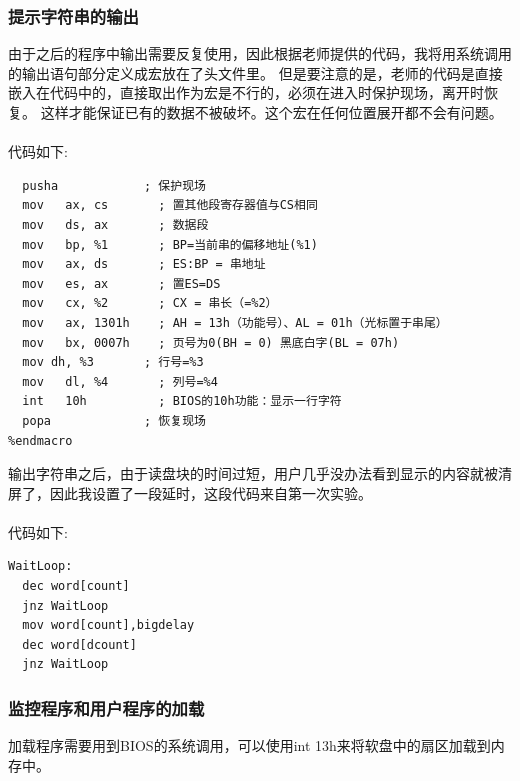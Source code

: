 \documentclass[a4paper, 11pt]{article} %
\begin{document}
\subsubsection{提示字符串的输出}

由于之后的程序中输出需要反复使用，因此根据老师提供的代码，我将用系统调用的输出语句部分定义成宏放在了头文件里。
但是要注意的是，老师的代码是直接嵌入在代码中的，直接取出作为宏是不行的，必须在进入时保护现场，离开时恢复。
这样才能保证已有的数据不被破坏。这个宏在任何位置展开都不会有问题。
\paragraph{}
代码如下:
\begin{lstlisting}[language={[x86masm]Assembler},caption=字符串输出宏]
%macro PRINT 4
  pusha            ; 保护现场
  mov	ax, cs       ; 置其他段寄存器值与CS相同
  mov	ds, ax       ; 数据段
  mov	bp, %1       ; BP=当前串的偏移地址(%1)
  mov	ax, ds       ; ES:BP = 串地址
  mov	es, ax       ; 置ES=DS
  mov	cx, %2       ; CX = 串长（=%2）
  mov	ax, 1301h    ; AH = 13h（功能号）、AL = 01h（光标置于串尾）
  mov	bx, 0007h    ; 页号为0(BH = 0) 黑底白字(BL = 07h)
  mov dh, %3       ; 行号=%3
  mov	dl, %4       ; 列号=%4
  int	10h          ; BIOS的10h功能：显示一行字符
  popa             ; 恢复现场
%endmacro
\end{lstlisting}

输出字符串之后，由于读盘块的时间过短，用户几乎没办法看到显示的内容就被清屏了，因此我设置了一段延时，这段代码来自第一次实验。

\paragraph{}
代码如下:
\begin{lstlisting}[language={[x86masm]Assembler},caption=延时]
WaitLoop:
  dec word[count]			
  jnz WaitLoop				
  mov word[count],bigdelay
  dec word[dcount]			
  jnz WaitLoop
\end{lstlisting}

\subsubsection{监控程序和用户程序的加载}
加载程序需要用到BIOS的系统调用，可以使用int 13h来将软盘中的扇区加载到内存中。
\end{document}
